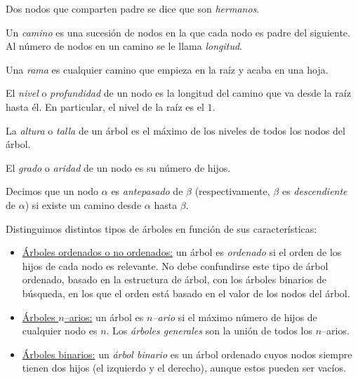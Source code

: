 \begin{defi}\label{def nodos hermanos}
	 Dos nodos que comparten padre se dice que son \textit{hermanos}.
\end{defi}

\begin{defi}[Camino]\label{def camino}
	Un \textit{camino} es una sucesión de nodos en la que cada nodo es padre del siguiente. Al número de nodos en un camino se le llama \textit{longitud}.
\end{defi}

\begin{defi}[Rama]\label{def rama}
	Una \textit{rama} es cualquier camino que empieza en la raíz y acaba en una hoja.
\end{defi}

\begin{defi}[Nivel]\label{def nivel}
	El \textit{nivel} o \textit{profundidad} de un nodo es la longitud del camino que va desde la raíz hasta él. En particular, el nivel de la raíz es el $1$.
\end{defi}

\begin{defi}[Altura]\label{def altura}
	La \textit{altura} o \textit{talla} de un árbol es el máximo de los niveles de todos los nodos del árbol.
\end{defi}

\begin{defi}[Grado]\label{def grafo}
	El \textit{grado} o \textit{aridad} de un nodo es su número de hijos.
\end{defi}

\begin{defi}\label{def antepasado}
	Decimos que un nodo $\alpha$ es \textit{antepasado} de $\beta$ (respectivamente, $\beta$ es \textit{descendiente} de $\alpha$) si existe un camino desde $\alpha$ hasta $\beta$.
\end{defi}

Distinguimos distintos tipos de árboles en función de sus características:
\begin{itemize}
	\item \underline{Árboles ordenados o no ordenados:} un árbol es \textit{ordenado} si el orden de los hijos de cada nodo es relevante. No debe confundirse este tipo de árbol ordenado, basado en la estructura de árbol, con los árboles binarios de búsqueda, en los que el orden está basado en el valor de los nodos del árbol.
	\item \underline{Árboles $n$--arios:} un árbol es \textit{ $n$--ario} si el máximo número de hijos de cualquier nodo es $n$. Los \textit{árboles generales} son la unión de todos los $n$--arios.
	\item \underline{Árboles binarios:} un \textit{árbol binario} es un árbol ordenado cuyos nodos siempre tienen dos hijos (el izquierdo y el derecho), aunque estos pueden ser vacíos.
\end{itemize}

